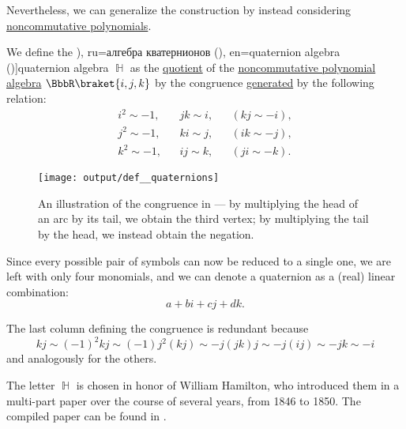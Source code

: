 Nevertheless, we can generalize the construction by instead considering \hyperref[def:noncommutative_polynomial_algebra]{noncommutative polynomials}.

\begin{definition}\label{def:quaternion_algebra}\mimprovised
  We define the \term[bg=кватерниони (\cite[454]{Обрешков1962ВисшаАлгебра}), ru=алгебра кватернионов (\cite[41]{Винберг2014КурсАлгебры}), en=quaternion algebra (\cite[exerc. III.1.12]{Aluffi2009Algebra})]{quaternion algebra} \( \BbbH \) as the \hyperref[def:algebra_over_ring/quotient]{quotient} of the \hyperref[def:noncommutative_polynomial_algebra]{noncommutative polynomial algebra} \( \BbbR\braket{ i, j, k } \) by the congruence \hyperref[def:first_order_generated_congruence]{generated} by the following relation:
  \begin{align*}
    i^2 \sim -1, && jk \sim i, && (kj \sim -i), \\
    j^2 \sim -1, && ki \sim j, && (ik \sim -j), \\
    k^2 \sim -1, && ij \sim k, && (ji \sim -k).
  \end{align*}

  \begin{figure}[!ht]
    \centering
    \texttt{[image: output/def\_\_quaternions]}
    \caption{An illustration of the congruence in  --- by multiplying the head of an arc by its tail, we obtain the third vertex; by multiplying the tail by the head, we instead obtain the negation.}\label{fig:def:quaternion_algebra}
  \end{figure}

  Since every possible pair of symbols can now be reduced to a single one, we are left with only four monomials, and we can denote a quaternion as a (real) linear combination:
  \begin{equation*}
    a + bi + cj + dk.
  \end{equation*}
\end{definition}
\begin{comments}
  \item The last column defining the congruence is redundant because
  \begin{equation*}
    kj \sim (-1)^2 kj \sim (-1) j^2 (kj) \sim -j (jk) j \sim -j (ij) \sim -jk \sim -i
  \end{equation*}
  and analogously for the others.

  \item The letter \( \BbbH \) is chosen in honor of William Hamilton, who introduced them in a multi-part paper over the course of several years, from 1846 to 1850. The compiled paper can be found in \cite{Hamilton2000Quaternions}.
\end{comments}

